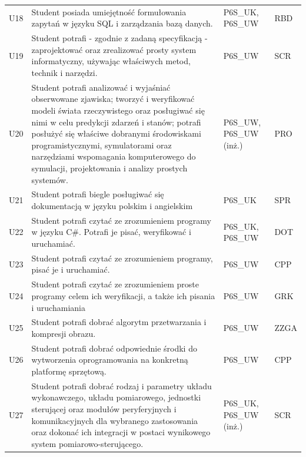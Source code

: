 \documentclass[12pt,a4paper]{article}
\begin{document}
{\begin{longtable}{m{1cm}m{8.8cm}m{2.1cm}m{2.5cm}}
\rowcolor{tableRowAlt} U18 & Student posiada umiejętność formułowania zapytań w języku SQL i zarządzania bazą danych. & {\scriptsize P6S\_UK, P6S\_UW} & {\scriptsize RBD} \\
\rowcolor{tableRowLight} U19 & Student potrafi - zgodnie z zadaną specyfikacją - zaprojektować oraz zrealizować prosty system informatyczny, używając właściwych metod, technik i narzędzi. & {\scriptsize P6S\_UW} & {\scriptsize SCR} \\
\rowcolor{tableRowAlt} U20 & Student potrafi analizować i wyjaśniać obserwowane zjawiska; tworzyć i weryfikować modeli świata rzeczywistego oraz posługiwać się nimi w celu predykcji zdarzeń i stanów; potrafi posłużyć się właściwe dobranymi środowiskami programistycznymi, symulatorami oraz narzędziami wspomagania komputerowego do symulacji, projektowania i analizy prostych systemów. & {\scriptsize P6S\_UW, P6S\_UW {\scriptsize (inż.)}} & {\scriptsize PRO} \\
\rowcolor{tableRowLight} U21 & Student potrafi biegle posługiwać się dokumentacją w języku polskim i angielskim & {\scriptsize P6S\_UK} & {\scriptsize SPR} \\
\rowcolor{tableRowAlt} U22 & Student potrafi czytać ze zrozumieniem programy w języku C\#. Potrafi je pisać, weryfikować i uruchamiać. & {\scriptsize P6S\_UK, P6S\_UW} & {\scriptsize DOT} \\
\rowcolor{tableRowLight} U23 & Student potrafi czytać ze zrozumieniem programy, pisać je i uruchamiać. & {\scriptsize P6S\_UW} & {\scriptsize CPP} \\
\rowcolor{tableRowAlt} U24 & Student potrafi czytać ze zrozumieniem proste programy celem ich weryfikacji, a także ich pisania i uruchamiania & {\scriptsize P6S\_UW} & {\scriptsize GRK} \\
\rowcolor{tableRowLight} U25 & Student potrafi dobrać algorytm przetwarzania i kompresji obrazu. & {\scriptsize P6S\_UW} & {\scriptsize ZZGA} \\
\rowcolor{tableRowAlt} U26 & Student potrafi dobrać odpowiednie środki do wytworzenia oprogramowania na konkretną platformę sprzętową. & {\scriptsize P6S\_UW} & {\scriptsize CPP} \\
\rowcolor{tableRowLight} U27 & Student potrafi dobrać rodzaj i parametry układu wykonawczego, układu pomiarowego, jednostki sterującej oraz modułów peryferyjnych i komunikacyjnych dla wybranego zastosowania oraz dokonać ich integracji w postaci wynikowego system pomiarowo-sterującego. & {\scriptsize P6S\_UK, P6S\_UW {\scriptsize (inż.)}} & {\scriptsize SCR} \\

\end{longtable}}
\end{document}
